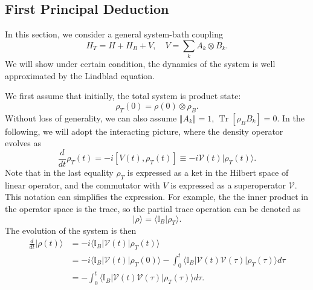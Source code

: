 \documentclass[aps,prb,superscriptaddress,nofootinbib]{revtex4}
\def \Tr{\operatorname{Tr}}
\begin{document}
\subsection{First Principal Deduction}
In this section, we consider a general system-bath coupling
\begin{equation}
	H_T = H + H_B + V, \quad V = \sum_k A_k \otimes B_k.
\end{equation}
We will show under certain condition, the dynamics of the system is well approximated by the Lindblad equation.

We first assume that initially, the total system is product state:
\begin{equation}
	\rho_T(0) = \rho(0) \otimes \rho_B.
\end{equation}
Without loss of generality, we can also assume $\Vert A_k \Vert =1$, $\Tr[\rho_B B_k]=0$.
In the following, we will adopt the interacting picture, where the density operator evolves as
\begin{equation}
	\frac{d}{dt} \rho_T(t) = -i[V(t), \rho_T(t)] \equiv -i\mathcal V(t) |\rho_T(t) \rangle.
\end{equation}
Note that in the last equality $\rho_T$ is expressed as a ket in the Hilbert space of linear operator, and the commutator with $V$ is expressed as a superoperator $\mathcal V$.
This notation can simplifies the expression.
For example, the the inner product in the operator space is the trace, so the partial trace operation can be denoted as
\begin{equation}
	|\rho\rangle = \langle \mathbb I_B|\rho_T\rangle.
\end{equation}
The evolution of the system is then 
\begin{equation}
\begin{aligned}
	\frac{d}{dt} |\rho(t)\rangle &= -i \langle \mathbb I_B|\mathcal V(t) |\rho_T(t)\rangle \\
	&= -i \langle \mathbb I_B|\mathcal{V}(t) |\rho_T(0)\rangle - \int_0^t \langle \mathbb I_B| \mathcal{V}(t) \mathcal{V}(\tau) |\rho_T(\tau)\rangle d\tau \\
	&= - \int_0^t \langle \mathbb I_B| \mathcal{V}(t) \mathcal{V}(\tau) |\rho_T(\tau)\rangle d\tau.
\end{aligned}
\end{equation}
\end{document}
